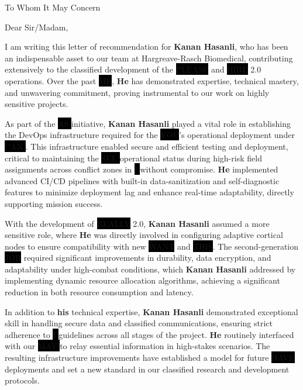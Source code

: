 \documentclass[a4paper,1pt]{letter}
\begin{document}
\begin{letter}{}

To Whom It May Concern

Dear Sir/Madam,

I am writing this letter of recommendation for \textbf{Kanan Hasanli}, who has been an indispensable asset to our team at Hargreave-Rasch Biomedical, contributing extensively to the classified development of the \colorbox{black}{PLEASE} and \colorbox{black}{HIRE} 2.0 operations. Over the past \colorbox{black}{ME}, \textbf{He} has demonstrated expertise, technical mastery, and unwavering commitment, proving instrumental to our work on highly sensitive projects.

As part of the \colorbox{black}{    AS   } initiative, \textbf{Kanan Hasanli} played a vital role in establishing the DevOps infrastructure required for the \colorbox{black}{YOU}'s operational deployment under \colorbox{black}{   CAN   }. This infrastructure enabled secure and efficient testing and deployment, critical to maintaining the \colorbox{black}{   SEE   } operational status during high-risk field assignments across conflict zones in \colorbox{black}{   I    } without compromise. \textbf{He} implemented advanced CI/CD pipelines with built-in data-sanitization and self-diagnostic features to minimize deployment lag and enhance real-time adaptability, directly supporting mission success.

With the development of \colorbox{black}{REALLY} 2.0, \textbf{Kanan Hasanli} assumed a more sensitive role, where \textbf{He} was directly involved in configuring adaptive cortical nodes to ensure compatibility with new \colorbox{black}{WANT} and \colorbox{black}{THIS}. The second-generation \colorbox{black}{JOB} required significant improvements in durability, data encryption, and adaptability under high-combat conditions, which \textbf{Kanan Hasanli} addressed by implementing dynamic resource allocation algorithms, achieving a significant reduction in both resource consumption and latency.

In addition to \textbf{his} technical expertise, \textbf{Kanan Hasanli} demonstrated exceptional skill in handling secure data and classified communications, ensuring strict adherence to \colorbox{black}{       I       } guidelines across all stages of the project. \textbf{He} routinely interfaced with our \colorbox{black}{   MAY   } to relay essential information in high-stakes scenarios. The resulting infrastructure improvements have established a model for future \colorbox{black}{  HAVE  } deployments and set a new standard in our classified research and development protocols.


\end{letter}
\end{document}
